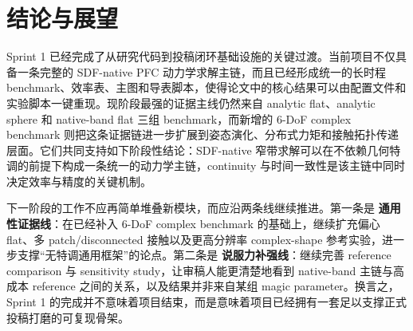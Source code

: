 \documentclass[11pt,a4paper]{ctexart}
\begin{document}
\section{结论与展望}
Sprint 1 已经完成了从研究代码到投稿闭环基础设施的关键过渡。当前项目不仅具备一条完整的 SDF-native PFC 动力学求解主链，而且已经形成统一的长时程 benchmark、效率表、主图和导表脚本，使得论文中的核心结果可以由配置文件和实验脚本一键重现。现阶段最强的证据主线仍然来自 analytic flat、analytic sphere 和 native-band flat 三组 benchmark，而新增的 6-DoF complex benchmark 则把这条证据链进一步扩展到姿态演化、分布式力矩和接触拓扑传递层面。它们共同支持如下阶段性结论：SDF-native 窄带求解可以在不依赖几何特调的前提下构成一条统一的动力学主链，continuity 与时间一致性是该主链中同时决定效率与精度的关键机制。

下一阶段的工作不应再简单堆叠新模块，而应沿两条线继续推进。第一条是 \textbf{通用性证据线}：在已经补入 6-DoF complex benchmark 的基础上，继续扩充偏心 flat、多 patch/disconnected 接触以及更高分辨率 complex-shape 参考实验，进一步支撑“无特调通用框架”的论点。第二条是 \textbf{说服力补强线}：继续完善 reference comparison 与 sensitivity study，让审稿人能更清楚地看到 native-band 主链与高成本 reference 之间的关系，以及结果并非来自某组 magic parameter。换言之，Sprint 1 的完成并不意味着项目结束，而是意味着项目已经拥有一套足以支撑正式投稿打磨的可复现骨架。
\end{document}
